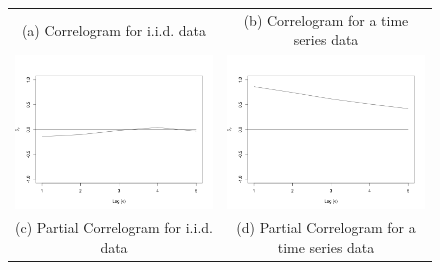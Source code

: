 \begin{figure}
\begin{center}
\begin{tabular}{cc}
(a) Correlogram for i.i.d. data & (b) Correlogram for a time series data \\
\includegraphics[scale=0.25]{./figures/CorrelogramGaussian} &
\includegraphics[scale=0.25]{./figures/CorrelogramTimeSerie} \\
(c) Partial Correlogram for i.i.d. data & (d) Partial Correlogram for a time series data \\

\end{tabular}
\end{center}
\end{figure}
